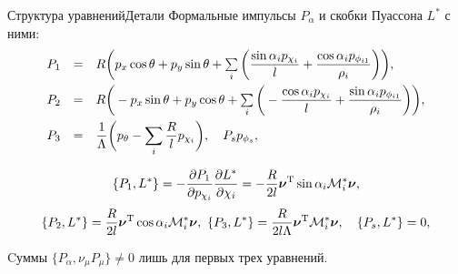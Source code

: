 \documentclass{beamer}
\renewcommand{\vec}[1]{\boldsymbol{\mathbf{#1}}}
\begin{document}
\begin{frame}{Структура уравнений}{Детали}
Формальные импульсы $P_\alpha$ и скобки Пуассона $L^{*}$ с ними:
\begin{equation*}\label{P}
    \begin{array}{rcl}
        P_1 & = & R\bigg(p_x\cos\theta + p_y\sin\theta + \sum\limits_{i}\bigg(\ddfrac{\sin\alpha_ip_{\chi_i}}{l} +  \ddfrac{\cos\alpha_ip_{\phi_{i1}}}{\rho_i}\bigg)\bigg),\vsp
        P_2 & = & R\bigg(-p_x\sin\theta + p_y\cos\theta + \sum\limits_{i}\bigg(-\ddfrac{\cos\alpha_ip_{\chi_i}}{l} +  \ddfrac{\sin\alpha_ip_{\phi_{i1}}}{\rho_i}\bigg)\bigg),\vsp
        P_3 & = & \ddfrac{1}{\Lambda}\bigg(p_\theta - \sum\limits_{i}\ddfrac{R}{l}p_{\chi_i}\bigg), \quad P_s p_{\phi_s},
    \end{array}
\end{equation*}

$$
\{P_1, L^*\} = -\frac{\partial P_1}{\partial p_{\chi_i}}\frac{\partial L^*}{\partial \chi_i} = -\frac{R}{2l}\vec{\nu}^\mathrm{T}\sin\alpha_i\M^*_i\vec{\nu},
$$
$$
\{P_2, L^*\} = \frac{R}{2l}\vec{\nu}^\mathrm{T}\cos\alpha_i\M^*_i\vec{\nu},\  
\{P_3, L^*\} = \frac{R}{2l\Lambda}\vec{\nu}^\mathrm{T}\M^*_i\vec{\nu},\quad \{P_s,L^*\} = 0,
$$

Cуммы $\{P_\alpha, \nu_\mu P_\mu\} \neq 0$ лишь для первых трех уравнений.
\end{frame}
\end{document}
